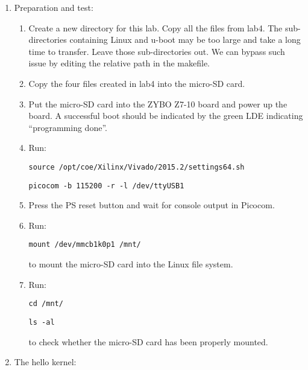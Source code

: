 \documentclass[11pt,letterpaper,titlepage]{article}
\begin{document}
\begin{enumerate}
    
    \item Preparation and test:
    
    \begin{enumerate}
        
        \item Create a new directory for this lab. Copy all the files from lab4. The sub-directories containing Linux and u-boot may be too large and take a long time to transfer. Leave those sub-directories out. We can bypass such issue by editing the relative path in the makefile.
        
        \item Copy the four files created in lab4 into the micro-SD card.
        
        \item Put the micro-SD card into the ZYBO Z7-10 board and power up the board. A successful boot should be indicated by the green LDE indicating ``programming done''.
        
        \item Run:
        
        \verb|source /opt/coe/Xilinx/Vivado/2015.2/settings64.sh|
        
        \verb|picocom -b 115200 -r -l /dev/ttyUSB1|
        
        \item Press the PS reset button and wait for console output in Picocom.
        
        \item Run:
        
        \verb|mount /dev/mmcb1k0p1 /mnt/|
        
        to mount the micro-SD card into the Linux file system.
        
        \item Run:
        
        \verb|cd /mnt/|
        
        \verb|ls -al|
        
        to check whether the micro-SD card has been properly mounted.
        
    \end{enumerate}
    
    \item The hello kernel:
    
    \begin{enumerate}
        

\end{enumerate}
\end{enumerate}
\end{document}
